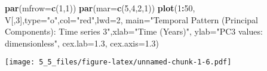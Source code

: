\documentclass[]{article}
\newenvironment{Shaded}{\begin{snugshade}}{\end{snugshade}}
\newcommand{\KeywordTok}[1]{\textcolor[rgb]{0.13,0.29,0.53}{\textbf{#1}}}
\newcommand{\DataTypeTok}[1]{\textcolor[rgb]{0.13,0.29,0.53}{#1}}
\newcommand{\DecValTok}[1]{\textcolor[rgb]{0.00,0.00,0.81}{#1}}
\newcommand{\FloatTok}[1]{\textcolor[rgb]{0.00,0.00,0.81}{#1}}
\newcommand{\StringTok}[1]{\textcolor[rgb]{0.31,0.60,0.02}{#1}}
\newcommand{\OperatorTok}[1]{\textcolor[rgb]{0.81,0.36,0.00}{\textbf{#1}}}
\newcommand{\NormalTok}[1]{#1}
\begin{document}
\begin{Shaded}
\begin{Highlighting}[]
\KeywordTok{par}\NormalTok{(}\DataTypeTok{mfrow=}\KeywordTok{c}\NormalTok{(}\DecValTok{1}\NormalTok{,}\DecValTok{1}\NormalTok{))}
\KeywordTok{par}\NormalTok{(}\DataTypeTok{mar=}\KeywordTok{c}\NormalTok{(}\DecValTok{5}\NormalTok{,}\DecValTok{4}\NormalTok{,}\DecValTok{2}\NormalTok{,}\DecValTok{1}\NormalTok{))}
\KeywordTok{plot}\NormalTok{(}\DecValTok{1}\OperatorTok{:}\DecValTok{50}\NormalTok{, V[,}\DecValTok{3}\NormalTok{],}\DataTypeTok{type=}\StringTok{"o"}\NormalTok{,}\DataTypeTok{col=}\StringTok{"red"}\NormalTok{,}\DataTypeTok{lwd=}\DecValTok{2}\NormalTok{,}
     \DataTypeTok{main=}\StringTok{"Temporal Pattern (Principal Components): Time series 3"}\NormalTok{,}\DataTypeTok{xlab=}\StringTok{"Time (Years)"}\NormalTok{,}
     \DataTypeTok{ylab=}\StringTok{"PC3 values: dimensionless"}\NormalTok{,}
     \DataTypeTok{cex.lab=}\FloatTok{1.3}\NormalTok{, }\DataTypeTok{cex.axis=}\FloatTok{1.3}\NormalTok{)}
\end{Highlighting}
\end{Shaded}

\texttt{[image: 5\_5\_files/figure-latex/unnamed-chunk-1-6.pdf]}
\end{document}
